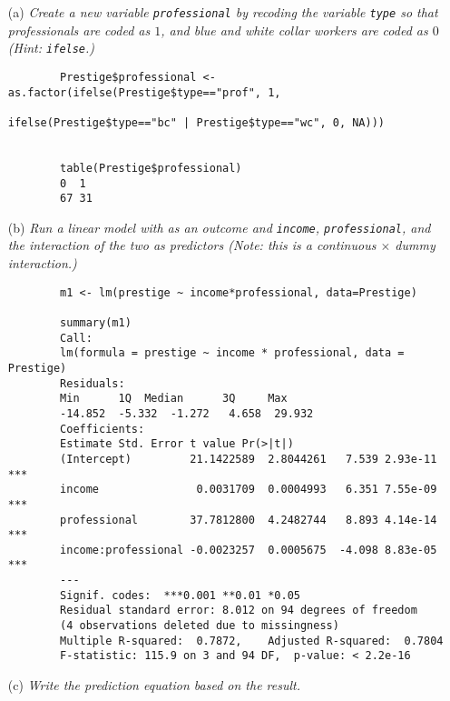 \documentclass[12pt,letterpaper]{article}
\begin{document}
	\newpage
	\begin{enumerate}
		
		\item [(a)]
		\textit{Create a new variable \texttt{professional} by recoding the variable \texttt{type} so that professionals are coded as $1$, and blue and white collar workers are coded as $0$ (Hint: \texttt{ifelse}.)}
		
		
		\begin{verbatim}
		Prestige$professional <- as.factor(ifelse(Prestige$type=="prof", 1,
																ifelse(Prestige$type=="bc" | Prestige$type=="wc", 0, NA)))

		
		table(Prestige$professional)
		0  1 
		67 31 
		\end{verbatim}
		
				 		\vspace{1cm}
		
		\item [(b)]
		\textit{Run a linear model with  as an outcome and \texttt{income}, \texttt{professional}, and the interaction of the two as predictors (Note: this is a continuous $\times$ dummy interaction.)}
				 		\vspace{.25cm}
		\begin{verbatim}
		m1 <- lm(prestige ~ income*professional, data=Prestige)
		
		summary(m1)
		Call:
		lm(formula = prestige ~ income * professional, data = Prestige)
		Residuals:
		Min      1Q  Median      3Q     Max 
		-14.852  -5.332  -1.272   4.658  29.932 
		Coefficients:
		Estimate Std. Error t value Pr(>|t|)    
		(Intercept)         21.1422589  2.8044261   7.539 2.93e-11 ***
		income               0.0031709  0.0004993   6.351 7.55e-09 ***
		professional        37.7812800  4.2482744   8.893 4.14e-14 ***
		income:professional -0.0023257  0.0005675  -4.098 8.83e-05 ***
		---
		Signif. codes:  ***0.001 **0.01 *0.05
		Residual standard error: 8.012 on 94 degrees of freedom
		(4 observations deleted due to missingness)
		Multiple R-squared:  0.7872,	Adjusted R-squared:  0.7804 
		F-statistic: 115.9 on 3 and 94 DF,  p-value: < 2.2e-16
		\end{verbatim}
		\newpage
		\item [(c)]
		\textit{Write the prediction equation based on the result.}
		

\end{enumerate}
\end{document}
